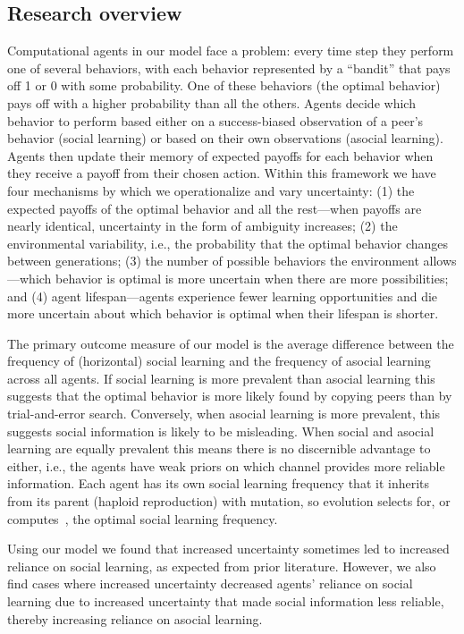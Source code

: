 \documentclass[letterpaper,11.5pt]{scrartcl}
\begin{document}
\subsection{Research overview}

Computational agents in our model face a problem: every time step they perform
one of several behaviors, with each behavior represented by a ``bandit'' that
pays off 1 or 0 with some probability. One of these behaviors (the optimal
behavior) pays off with a higher probability than all the others.
Agents decide which behavior to 
perform based either on a success-biased observation 
of a peer's behavior (social learning) or based on their own observations (asocial learning).
Agents then update their memory of expected payoffs for each behavior 
when they receive a payoff from their chosen
action. Within this framework we have four mechanisms by which we operationalize 
and vary uncertainty:
(1) the expected payoffs of the optimal behavior and all the rest---when payoffs
are nearly identical, uncertainty in the form of ambiguity increases; (2) the
environmental variability, i.e., the probability that the optimal behavior 
changes between generations; (3) the number of possible behaviors the environment allows---which
behavior is optimal is more uncertain when there are more possibilities; and (4)
 agent lifespan---agents experience fewer learning opportunities and die more uncertain about which behavior
is optimal when their lifespan is shorter. 

The primary outcome measure of our
model is the average difference between the frequency of (horizontal) 
social learning and the frequency of asocial
learning across all agents. If social learning is more prevalent than asocial
learning this suggests that the optimal behavior is more likely found
by copying peers than by trial-and-error search.
Conversely, when asocial learning is more prevalent, this suggests social information
is likely to be misleading. 
When social and asocial learning are 
equally prevalent this means there is no discernible advantage to either, i.e.,
the agents have weak priors on which channel provides more reliable information. 
Each agent has its own social learning frequency that it inherits from its
parent (haploid reproduction) with mutation, so evolution selects for,
or computes~\cite{Smaldino2013}, the optimal
social learning frequency.

Using our model we found that increased uncertainty sometimes
led to increased reliance on social learning, as expected from prior literature. However, we also find cases where increased uncertainty decreased agents' reliance on social learning
due to increased uncertainty that made social information less reliable, thereby
increasing reliance on asocial learning.
\end{document}
